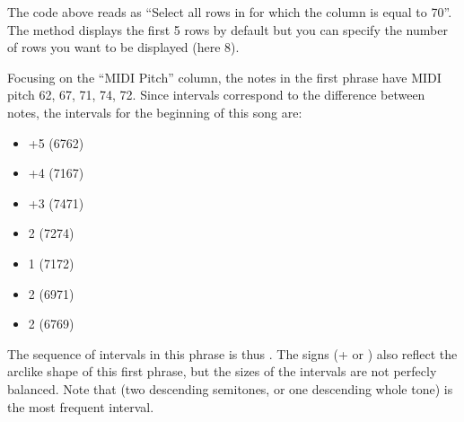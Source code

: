 \documentclass[letterpaper,10pt,english]{sphinxmanual}
\begin{document}
\sphinxAtStartPar
The code above reads as “Select all rows in  for which the column  is equal to 70”. The  method displays the first 5 rows by default but you can specify the number of rows you want to be displayed (here 8).

\sphinxAtStartPar
Focusing on the “MIDI Pitch” column, the notes in the first phrase have MIDI pitch 62, 67, 71, 74, 72. Since intervals correspond to the difference between notes, the intervals for the beginning of this song are:
\begin{itemize}
\item {} 
\sphinxAtStartPar
+5 (67\sphinxhyphen{}62)

\item {} 
\sphinxAtStartPar
+4 (71\sphinxhyphen{}67)

\item {} 
\sphinxAtStartPar
+3 (74\sphinxhyphen{}71)

\item {} 
\sphinxAtStartPar
\sphinxhyphen{}2 (72\sphinxhyphen{}74)

\item {} 
\sphinxAtStartPar
\sphinxhyphen{}1 (71\sphinxhyphen{}72)

\item {} 
\sphinxAtStartPar
\sphinxhyphen{}2 (69\sphinxhyphen{}71)

\item {} 
\sphinxAtStartPar
\sphinxhyphen{}2 (67\sphinxhyphen{}69)

\end{itemize}

\sphinxAtStartPar
The sequence of intervals in this phrase is thus . The signs (+ or \sphinxhyphen{}) also reflect the arc\sphinxhyphen{}like shape of this first phrase, but the sizes of the intervals are not perfecly balanced. Note that  (two descending semitones, or one descending whole tone) is the most frequent interval.
\end{document}
